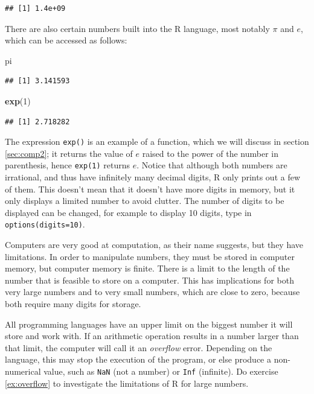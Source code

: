\documentclass[
]{book}
\newenvironment{Shaded}{\begin{snugshade}}{\end{snugshade}}
\newcommand{\DecValTok}[1]{\textcolor[rgb]{0.00,0.00,0.81}{#1}}
\newcommand{\KeywordTok}[1]{\textcolor[rgb]{0.13,0.29,0.53}{\textbf{#1}}}
\newcommand{\NormalTok}[1]{#1}
\theoremstyle{definition}
\theoremstyle{definition}
\theoremstyle{definition}
\theoremstyle{remark}
\begin{document}
\begin{verbatim}
## [1] 1.4e+09
\end{verbatim}

There are also certain numbers built into the R language, most notably \(\pi\) and \(e\), which can be accessed as follows:

\begin{Shaded}
\begin{Highlighting}[]
\NormalTok{pi}
\end{Highlighting}
\end{Shaded}

\begin{verbatim}
## [1] 3.141593
\end{verbatim}

\begin{Shaded}
\begin{Highlighting}[]
\KeywordTok{exp}\NormalTok{(}\DecValTok{1}\NormalTok{)}
\end{Highlighting}
\end{Shaded}

\begin{verbatim}
## [1] 2.718282
\end{verbatim}

The expression \texttt{exp()} is an example of a function, which we will discuss in section \ref{sec:comp2}; it returns the value of \(e\) raised to the power of the number in parenthesis, hence \texttt{exp(1)} returns \(e\). Notice that although both numbers are irrational, and thus have infinitely many decimal digits, R only prints out a few of them. This doesn't mean that it doesn't have more digits in memory, but it only displays a limited number to avoid clutter. The number of digits to be displayed can be changed, for example to display 10 digits, type in \texttt{options(digits=10)}.

Computers are very good at computation, as their name suggests, but they have limitations. In order to manipulate numbers, they must be stored in computer memory, but computer memory is finite. There is a limit to the length of the number that is feasible to store on a computer. This has implications for both very large numbers and to very small numbers, which are close to zero, because both require many digits for storage.

All programming languages have an upper limit on the biggest number it will store and work with. If an arithmetic operation results in a number larger than that limit, the computer will call it an \emph{overflow} error. Depending on the language, this may stop the execution of the program, or else produce a non-numerical value, such as \texttt{NaN} (not a number) or \texttt{Inf} (infinite). Do exercise \ref{ex:overflow} to investigate the limitations of R for large numbers.
\end{document}
